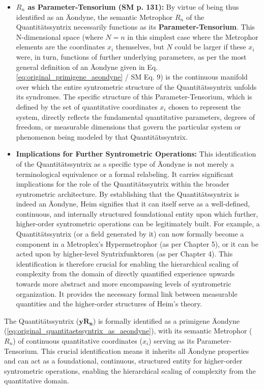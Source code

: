 \documentclass[12pt]{article}
\newcommand{\quantitaetssyntrix}{\bm{yR_n}}
\newcommand{\semantischermetrophor}{R_n}
\begin{document}
\begin{itemize}
    \item \textbf{\( \semantischermetrophor \) as Parameter-Tensorium (SM p. 131):}
    By virtue of being thus identified as an Äondyne, the semantic Metrophor \( \semantischermetrophor \) of the Quantitätssyntrix necessarily functions as its \textbf{Parameter-Tensorium}. This N-dimensional space (where \( N=n \) in this simplest case where the Metrophor elements are the coordinates \(x_i\) themselves, but \(N\) could be larger if these \( x_i \) were, in turn, functions of further underlying parameters, as per the most general definition of an Äondyne given in Eq. \eqref{eq:original_primigene_aeondyne} / SM Eq. 9) is the continuous manifold over which the entire syntrometric structure of the Quantitätssyntrix unfolds its syndromes. The specific structure of this Parameter-Tensorium, which is defined by the set of quantitative coordinates \( x_i \) chosen to represent the system, directly reflects the fundamental quantitative parameters, degrees of freedom, or measurable dimensions that govern the particular system or phenomenon being modeled by that Quantitätssyntrix.

    \item \textbf{Implications for Further Syntrometric Operations:}
    This identification of the Quantitätssyntrix as a specific type of Äondyne is not merely a terminological equivalence or a formal relabeling. It carries significant implications for the role of the Quantitätssyntrix within the broader syntrometric architecture. By establishing that the Quantitätssyntrix is indeed an Äondyne, Heim signifies that it can itself serve as a well-defined, continuous, and internally structured foundational entity upon which further, higher-order syntrometric operations can be legitimately built. For example, a Quantitätssyntrix (or a field generated by it) can now formally become a component in a Metroplex's Hypermetrophor (as per Chapter 5), or it can be acted upon by higher-level Syntrixfunktoren (as per Chapter 4). This identification is therefore crucial for enabling the hierarchical scaling of complexity from the domain of directly quantified experience upwards towards more abstract and more encompassing levels of syntrometric organization. It provides the necessary formal link between measurable quantities and the higher-order structures of Heim's theory.
\end{itemize}

The Quantitätssyntrix (\(\quantitaetssyntrix\)) is formally identified as a primigene Äondyne (\eqref{eq:original_quantitaetssyntrix_as_aeondyne}), with its semantic Metrophor (\(R_n\)) of continuous quantitative coordinates (\(x_i\)) serving as its Parameter-Tensorium. This crucial identification means it inherits all Äondyne properties and can act as a foundational, continuous, structured entity for higher-order syntrometric operations, enabling the hierarchical scaling of complexity from the quantitative domain.
\end{document}
